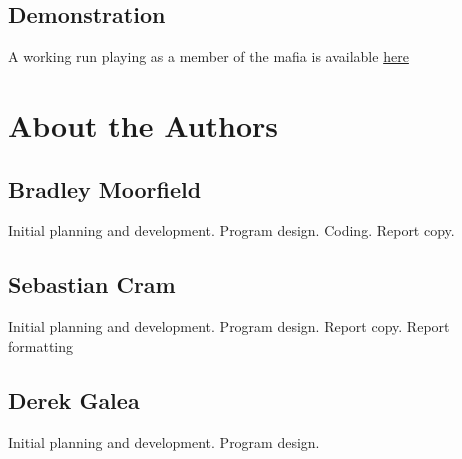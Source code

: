\documentclass[12pt]{article} %
\begin{document}
\subsection{Demonstration}

A working run playing as a member of the mafia is available
\href{https://www.dropbox.com/s/go9x8617lvtuozv/Mafia%20Demonstration.mp4?dl=0}{here}


\section{About the Authors}

\subsection{Bradley Moorfield}

Initial planning and development. Program design. Coding. Report copy.

\subsection{Sebastian Cram}

Initial planning and development. Program design. Report copy. Report formatting

\subsection{Derek Galea}

Initial planning and development. Program design.



\end{document}
